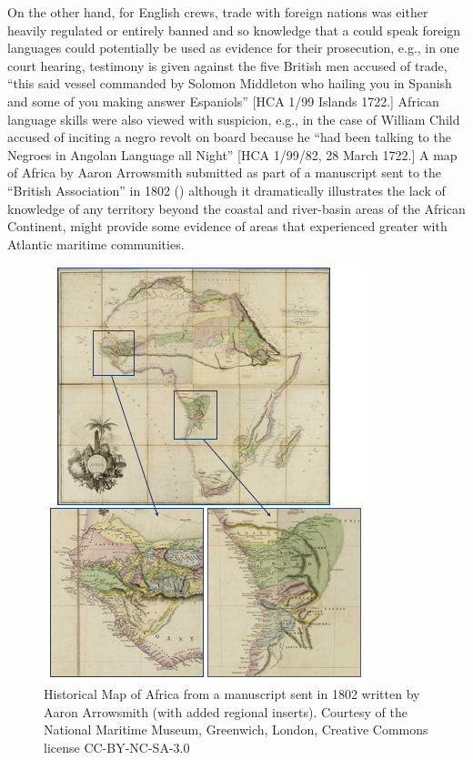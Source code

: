   On the other hand, for English crews, trade with foreign nations was either heavily regulated or entirely banned and so knowledge that a  could speak foreign languages could potentially be used as evidence for their prosecution, e.g., in one court hearing, testimony is given against the five British men accused of  trade, “this said vessel commanded by Solomon Middleton who hailing you in Spanish and some of you making answer Espaniols” [HCA 1/99  Islands 1722.] African language skills were also viewed with suspicion, e.g., in the case of William Child accused of inciting a negro revolt on board because he “had been talking to the Negroes in Angolan Language all Night” [HCA 1/99/82, 28 March {1722}.] A map of Africa by Aaron Arrowsmith submitted as part of a manuscript sent to the “British Association” in 1802 () although it dramatically illustrates the lack of knowledge of any territory beyond the coastal and river-basin areas of the African Continent, might provide some evidence of areas that experienced greater  with Atlantic maritime communities. 

\begin{figure}
 

\includegraphics[width=\textwidth]{figures/delgado-img5.png}

\caption{\label{fig:key:3.5} Historical Map of Africa from a manuscript sent in 1802 written by Aaron Arrowsmith (with added regional inserts). Courtesy of the National Maritime Museum, Greenwich, London, Creative Commons license CC-BY-NC-SA-3.0}
\end{figure}

